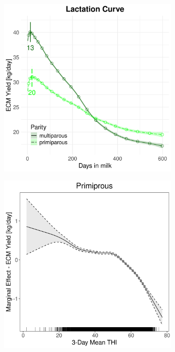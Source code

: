 \begin{figure}[H]
\begin{subfigure}[b]{0.45\textwidth}
        \includegraphics[width=\textwidth]{thesis/figures/models/ecm/full/je_ecm_full/je_ecm_full_marginal_dim_milk_combined.png}
    \end{subfigure}
    \begin{subfigure}[b]{0.45\textwidth}
        \centering
        \includegraphics[width=\textwidth]{thesis/figures/models/ecm/full/je_ecm_full/je_ecm_full_marginal_thi_milk_primi.png}

\end{subfigure}
\end{figure}
